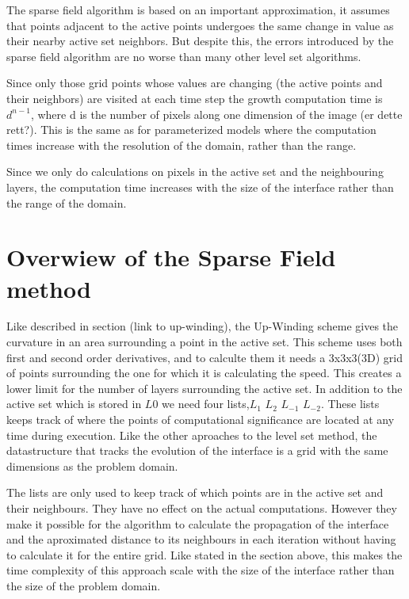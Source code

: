 The sparse field algorithm is based on an important approximation, it assumes that points adjacent to the active points undergoes the same change in value as their nearby active set neighbors. But despite this, the errors introduced by the sparse field algorithm are no worse than many other level set algorithms. 



Since only those grid points whose values are changing (the active points and their neighbors) are visited at each time step the growth computation time is \(d^{n-1}\), where d is the number of pixels along one dimension of the image (er dette rett?). This is the same as for parameterized models where the computation times increase with the resolution of the domain, rather than the range. 

Since we only do calculations on pixels in the active set and the neighbouring layers, the computation time increases with the size of the interface rather than the range of the domain.




\section{Overwiew of the Sparse Field method}

Like described in section (link to up-winding), the Up-Winding scheme gives the curvature in an area surrounding a point in the active set. This scheme uses both first and second order derivatives, and to calculte them it needs a 3x3x3(3D) grid of points surrounding the one for which it is calculating the speed. This creates a lower limit for the number of layers surrounding the active set. In addition to the active set which is stored in \(L{0}\) we need four lists,\(L_{1}\)  \(L_{2}\) \(L_{-1}\) \(L_{-2}\). These lists keeps track of where the points of computational significance are located at any time during execution. Like the other aproaches to the level set method, the datastructure that tracks the evolution of the interface is a grid with the same dimensions as the problem domain. 


The lists are only used to keep track of which points are in the active set and their neighbours. They have no effect on the actual computations. 
However they make it possible for the algorithm to calculate the propagation of the interface and the aproximated distance to its neighbours in each iteration without having to calculate it for the entire grid. Like stated in the section above, this makes the time complexity of this approach scale with the size of the interface rather than the size of the problem domain.

